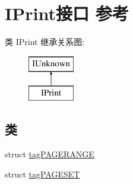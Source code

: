 \hypertarget{interface_i_print}{}\section{I\+Print接口 参考}
\label{interface_i_print}
类 I\+Print 继承关系图\+:\begin{figure}[H]
\begin{center}
\leavevmode
\includegraphics[height=2.000000cm]{interface_i_print}
\end{center}
\end{figure}
\subsection*{类}
\begin{DoxyCompactItemize}
\item 
struct \hyperlink{struct_i_print_1_1tag_p_a_g_e_r_a_n_g_e}{tag\+P\+A\+G\+E\+R\+A\+N\+GE}
\item 
struct \hyperlink{struct_i_print_1_1tag_p_a_g_e_s_e_t}{tag\+P\+A\+G\+E\+S\+ET}
\end{DoxyCompactItemize}
